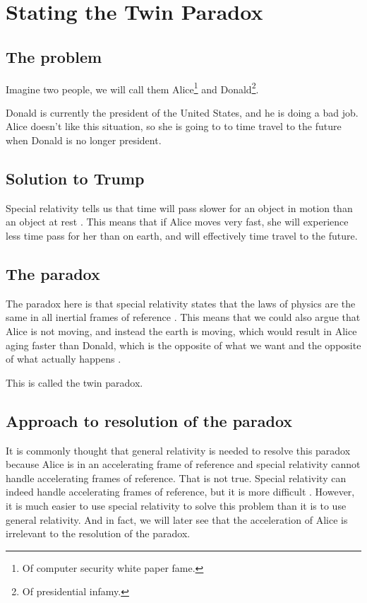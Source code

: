 \chapter{Stating the Twin Paradox}
	\section{The problem}
		Imagine two people, we will call them Alice\footnote{Of computer security white paper fame.} and Donald\footnote{Of presidential infamy.}.

		Donald is currently the president of the United States, and he is doing a bad job.
		Alice doesn't like this situation, so she is going to to time travel to the future when Donald is no longer president.
	\section{Solution to Trump}
		Special relativity tells us that time will pass slower for an object in motion than an object at rest \autocites{textbook}{einstein1916}.
		This means that if Alice moves very fast, she will experience less time pass for her than on earth, and will effectively time travel to the future.
	\section{The paradox}
		The paradox here is that special relativity states that the laws of physics are the same in all inertial frames of reference \autocites{textbook}{einstein1916}.
		This means that we could also argue that Alice is not moving, and instead the earth is moving, which would result in Alice aging faster than Donald, which is the opposite of what we want and the opposite of what actually happens \autocite[\ppno~593--594]{textbook}.

		This is called the twin paradox.
	\section{Approach to resolution of the paradox}
		It is commonly thought that general relativity is needed to resolve this paradox because Alice is in an accelerating frame of reference and special relativity cannot handle accelerating frames of reference.
		That is not true.
		Special relativity can indeed handle accelerating frames of reference, but it is more difficult \autocites{sracceleration}{twinparadox}.
		However, it is much easier to use special relativity to solve this problem than it is to use general relativity.
		And in fact, we will later see that the acceleration of Alice is irrelevant to the resolution of the paradox.

